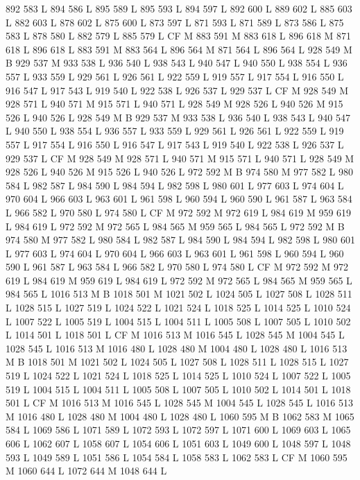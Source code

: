 {{{{{{{{{{{{{{{{{{892 583 L
894 586 L
895 589 L
895 593 L
894 597 L
892 600 L
889 602 L
885 603 L
882 603 L
878 602 L
875 600 L
873 597 L
871 593 L
871 589 L
873 586 L
875 583 L
878 580 L
882 579 L
885 579 L
CF M
883 591 M 883 618 L
896 618 M 871 618 L
896 618 L
883 591 M 883 564 L
896 564 M 871 564 L
896 564 L
928 549 M B
929 537 M 933 538 L
936 540 L
938 543 L
940 547 L
940 550 L
938 554 L
936 557 L
933 559 L
929 561 L
926 561 L
922 559 L
919 557 L
917 554 L
916 550 L
916 547 L
917 543 L
919 540 L
922 538 L
926 537 L
929 537 L
CF M
928 549 M 928 571 L
940 571 M 915 571 L
940 571 L
928 549 M 928 526 L
940 526 M 915 526 L
940 526 L
928 549 M B
929 537 M 933 538 L
936 540 L
938 543 L
940 547 L
940 550 L
938 554 L
936 557 L
933 559 L
929 561 L
926 561 L
922 559 L
919 557 L
917 554 L
916 550 L
916 547 L
917 543 L
919 540 L
922 538 L
926 537 L
929 537 L
CF M
928 549 M 928 571 L
940 571 M 915 571 L
940 571 L
928 549 M 928 526 L
940 526 M 915 526 L
940 526 L
972 592 M B
974 580 M 977 582 L
980 584 L
982 587 L
984 590 L
984 594 L
982 598 L
980 601 L
977 603 L
974 604 L
970 604 L
966 603 L
963 601 L
961 598 L
960 594 L
960 590 L
961 587 L
963 584 L
966 582 L
970 580 L
974 580 L
CF M
972 592 M 972 619 L
984 619 M 959 619 L
984 619 L
972 592 M 972 565 L
984 565 M 959 565 L
984 565 L
972 592 M B
974 580 M 977 582 L
980 584 L
982 587 L
984 590 L
984 594 L
982 598 L
980 601 L
977 603 L
974 604 L
970 604 L
966 603 L
963 601 L
961 598 L
960 594 L
960 590 L
961 587 L
963 584 L
966 582 L
970 580 L
974 580 L
CF M
972 592 M 972 619 L
984 619 M 959 619 L
984 619 L
972 592 M 972 565 L
984 565 M 959 565 L
984 565 L
1016 513 M B
1018 501 M 1021 502 L
1024 505 L
1027 508 L
1028 511 L
1028 515 L
1027 519 L
1024 522 L
1021 524 L
1018 525 L
1014 525 L
1010 524 L
1007 522 L
1005 519 L
1004 515 L
1004 511 L
1005 508 L
1007 505 L
1010 502 L
1014 501 L
1018 501 L
CF M
1016 513 M 1016 545 L
1028 545 M 1004 545 L
1028 545 L
1016 513 M 1016 480 L
1028 480 M 1004 480 L
1028 480 L
1016 513 M B
1018 501 M 1021 502 L
1024 505 L
1027 508 L
1028 511 L
1028 515 L
1027 519 L
1024 522 L
1021 524 L
1018 525 L
1014 525 L
1010 524 L
1007 522 L
1005 519 L
1004 515 L
1004 511 L
1005 508 L
1007 505 L
1010 502 L
1014 501 L
1018 501 L
CF M
1016 513 M 1016 545 L
1028 545 M 1004 545 L
1028 545 L
1016 513 M 1016 480 L
1028 480 M 1004 480 L
1028 480 L
1060 595 M B
1062 583 M 1065 584 L
1069 586 L
1071 589 L
1072 593 L
1072 597 L
1071 600 L
1069 603 L
1065 606 L
1062 607 L
1058 607 L
1054 606 L
1051 603 L
1049 600 L
1048 597 L
1048 593 L
1049 589 L
1051 586 L
1054 584 L
1058 583 L
1062 583 L
CF M
1060 595 M 1060 644 L
1072 644 M 1048 644 L
}}}}}}}}}}}}}}}}}}
